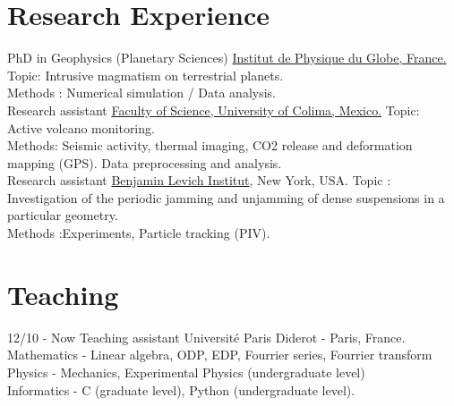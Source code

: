\documentclass[]{friggeri-cv}
\begin{document}
\section{Research Experience}
\begin{entrylist}
    {PhD in  Geophysics (Planetary  Sciences)}
  {\href{http://www.ipgp.fr/fr/pss/planetologie-sciences-spatiales}{Institut
      de Physique du Globe, France.}}
  {Topic: Intrusive magmatism on terrestrial planets. \\
    Methods : Numerical simulation /  Data analysis. \\}  {Research assistant} {\href{http://ciiv.ucol.mx/}{Faculty
      of Science, University of Colima, Mexico.}}
  {Topic: Active volcano monitoring. \\
    Methods:  Seismic  activity,  thermal  imaging,  CO2  release  and
    deformation  mapping (GPS).  Data  preprocessing and  analysis.\\}
        {Research      assistant}
  {\href{http://lisgi1.engr.ccny.cuny.edu/}{Benjamin Levich Institut},
    New York,  USA.}  {Topic :  Investigation of the  periodic jamming
    and unjamming of dense suspensions
    in a particular geometry.\\
    Methods :Experiments, Particle tracking (PIV).\\}
\end{entrylist}


\section{Teaching}
\begin{entrylist}
  \entry
    {12/10 - Now}
    {Teaching assistant}
    {Université Paris Diderot - Paris, France.}
    {Mathematics - Linear algebra, ODP, EDP, Fourrier series, Fourrier transform
    Physics - Mechanics, Experimental Physics (undergraduate level)\\
    Informatics - C (graduate level), Python (undergraduate level).\\}
\end{entrylist}
\end{document}
